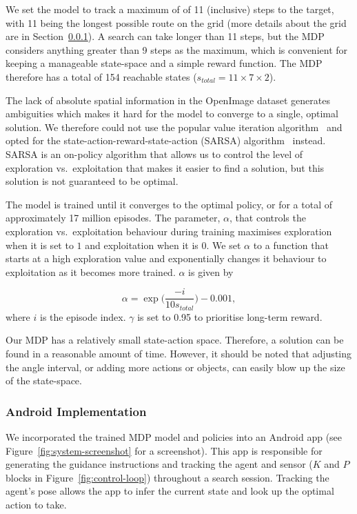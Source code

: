 \documentclass[a4paper, twoside]{article}
\begin{document}
We set the model to track a maximum of of 11 (inclusive) steps to the target, with 11 being the longest possible route on the grid (more details about the grid are in Section~\ref{sec:system-implementation}). A search can take longer than 11 steps, but the MDP considers anything greater than 9 steps as the maximum, which is convenient for keeping a manageable state-space and a simple reward function. The MDP therefore has a total of 154 reachable states ($s_{total}=11\times7\times2$).

The lack of absolute spatial information in the OpenImage dataset generates ambiguities which makes it hard for the model to converge to a single, optimal solution. We therefore could not use the popular value iteration algorithm~\cite{bellman1957markovian} and opted for the state-action-reward-state-action (SARSA) algorithm~\cite{rummery1994line} instead. SARSA is an on-policy algorithm that allows us to control the level of exploration vs.\ exploitation that makes it easier to find a solution, but this solution is not guaranteed to be optimal. 

The model is trained until it converges to the optimal policy, or for a total of approximately 17 million episodes. The parameter, $\alpha$, that controls the exploration vs.\ exploitation behaviour during training maximises exploration when it is set to $1$ and exploitation when it is $0$. We set $\alpha$ to a function that starts at a high exploration value and exponentially changes it behaviour to exploitation as it becomes more trained. $\alpha$ is given by 

\begin{equation}
  \alpha = \exp\Big(\frac{-i}{10s_{total}}\Big) - 0.001,
\end{equation}
where $i$ is the episode index.  $\gamma$ is set to 0.95 to prioritise long-term reward. 

Our MDP has a relatively small state-action space. Therefore, a solution can be found in a reasonable amount of time. However, it should be noted that adjusting the angle interval, or adding more actions or objects, can easily blow up the size of the state-space. 

\subsubsection{Android Implementation}\label{sec:system-implementation}

We incorporated the trained MDP model and policies into an Android app (see Figure~\ref{fig:system-screenshot} for a screenshot). This app is responsible for generating the guidance instructions and tracking the agent and sensor ($K$ and $P$ blocks in Figure~\ref{fig:control-loop}) throughout a search session. Tracking the agent's pose allows the app to infer the current state and look up the optimal action to take. 
\end{document}
